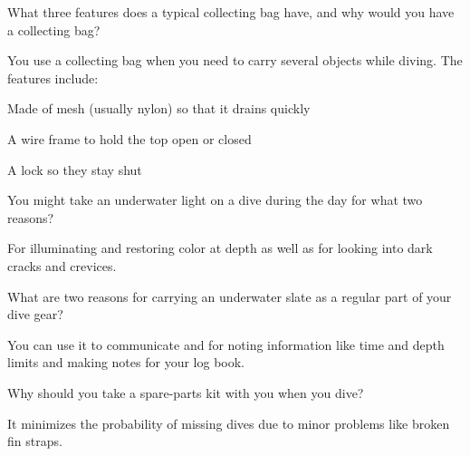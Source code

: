 	\begin{qanda}
		\begin{question}
What three features does a typical collecting bag have, and why would you have a collecting bag?
		\end{question}

		\begin{answer}
You use a collecting bag when you need to carry several objects while diving.  The features include:
			\begin{nospacenumberedlist}
				\item Made of mesh (usually nylon) so that it drains quickly
				\item A wire frame to hold the top open or closed
				\item A lock so they stay shut
			\end{nospacenumberedlist}
		\end{answer}
	\end{qanda}

	\begin{qanda}
		\begin{question}
You might take an underwater light on a dive during the day for what two reasons?
		\end{question}

		\begin{answer}
For illuminating and restoring color at depth as well as for looking into dark cracks and crevices.
		\end{answer}
	\end{qanda}

	\begin{qanda}
		\begin{question}
What are two reasons for carrying an underwater slate as a regular part of your dive gear?
		\end{question}

		\begin{answer}
You can use it to communicate and for noting information like time and depth limits and making notes for your log book.
		\end{answer}
	\end{qanda}

	\begin{qanda}
		\begin{question}
Why should you take a spare-parts kit with you when you dive?
		\end{question}

		\begin{answer}
It minimizes the probability of missing dives due to minor problems like broken fin straps.
		\end{answer}
	\end{qanda}

